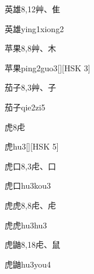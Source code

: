 \begin{entry}{英雄}{8,12}{⾋、⾫}
  \begin{phonetics}{英雄}{ying1xiong2}
  \end{phonetics}
\end{entry}

\begin{entry}{苹果}{8,8}{⾋、⽊}
  \begin{phonetics}{苹果}{ping2guo3}[][HSK 3]
  \end{phonetics}
\end{entry}

\begin{entry}{茄子}{8,3}{⾋、⼦}
  \begin{phonetics}{茄子}{qie2zi5}
  \end{phonetics}
\end{entry}

\begin{entry}{虎}{8}{⾌}
  \begin{phonetics}{虎}{hu3}[][HSK 5]
  \end{phonetics}
\end{entry}

\begin{entry}{虎口}{8,3}{⾌、⼝}
  \begin{phonetics}{虎口}{hu3kou3}
  \end{phonetics}
\end{entry}

\begin{entry}{虎虎}{8,8}{⾌、⾌}
  \begin{phonetics}{虎虎}{hu3hu3}
  \end{phonetics}
\end{entry}

\begin{entry}{虎鼬}{8,18}{⾌、⿏}
  \begin{phonetics}{虎鼬}{hu3you4}
  \end{phonetics}
\end{entry}

